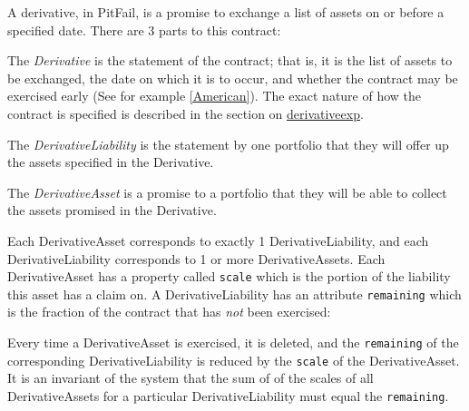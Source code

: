 \documentclass[a4]{article}
\begin{document}
A derivative, in PitFail, is a promise to exchange a list of assets on or
before a specified date. There are 3 parts to this contract:
\setcounter{listcnt0}{0}
\begin{list}{.}
{
\setlength{\rightmargin}{\leftmargin}
}

\item The \emph{Derivative} is the statement of the contract; that is, it is the list
of assets to be exchanged, the date on which it is to occur, and whether the
contract may be exercised early (See for example \hyperlink{american}{[American]}). The exact
nature of how the contract is specified is described in the section on
\hyperref[derivativeexp]{derivativeexp}.

\item The \emph{DerivativeLiability} is the statement by one portfolio that they will
offer up the assets specified in the Derivative.

\item The \emph{DerivativeAsset} is a promise to a portfolio that they will be able to collect
the assets promised in the Derivative.
\end{list}

Each DerivativeAsset corresponds to exactly 1 DerivativeLiability, and each
DerivativeLiability corresponds to 1 or more DerivativeAssets. Each
DerivativeAsset has a property called \texttt{scale} which is the portion of the
liability this asset has a claim on. A DerivativeLiability has an attribute
\texttt{remaining} which is the fraction of the contract that has \emph{not} been
exercised:
\begin{figure}
\noindent{}
\end{figure}

Every time a DerivativeAsset is exercised, it is deleted, and the \texttt{remaining}
of the corresponding DerivativeLiability is reduced by the \texttt{scale} of the
DerivativeAsset. It is an invariant of the system that the sum of of the scales
of all DerivativeAssets for a particular DerivativeLiability must equal the
\texttt{remaining}.
\end{document}
